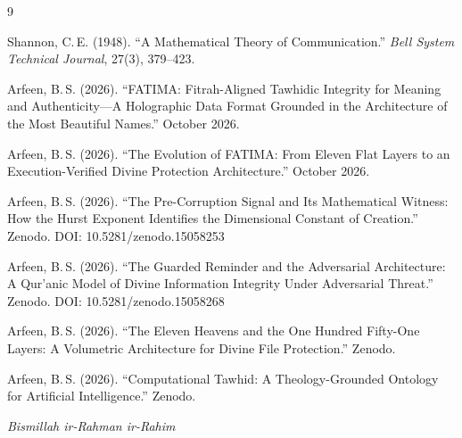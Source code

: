 \documentclass[11pt,a4paper]{article}
\begin{document}
\begin{thebibliography}{9}

Shannon, C.\,E. (1948).
``A Mathematical Theory of Communication.''
\textit{Bell System Technical Journal}, 27(3), 379--423.

Arfeen, B.\,S. (2026).
``FATIMA: Fitrah-Aligned Tawhidic Integrity for Meaning and Authenticity---A Holographic Data Format Grounded in the Architecture of the Most Beautiful Names.''
October 2026.

Arfeen, B.\,S. (2026).
``The Evolution of FATIMA: From Eleven Flat Layers to an Execution-Verified Divine Protection Architecture.''
October 2026.

Arfeen, B.\,S. (2026).
``The Pre-Corruption Signal and Its Mathematical Witness: How the Hurst Exponent Identifies the Dimensional Constant of Creation.''
Zenodo. DOI: 10.5281/zenodo.15058253

Arfeen, B.\,S. (2026).
``The Guarded Reminder and the Adversarial Architecture: A Qur'anic Model of Divine Information Integrity Under Adversarial Threat.''
Zenodo. DOI: 10.5281/zenodo.15058268

Arfeen, B.\,S. (2026).
``The Eleven Heavens and the One Hundred Fifty-One Layers: A Volumetric Architecture for Divine File Protection.''
Zenodo.

Arfeen, B.\,S. (2026).
``Computational Tawhid: A Theology-Grounded Ontology for Artificial Intelligence.''
Zenodo.

\end{thebibliography}

\vspace{2em}
\begin{center}
{\Large\textcolor{bismillahgreen}{\textit{Bismillah ir-Rahman ir-Rahim}}}
\end{center}
\end{document}
